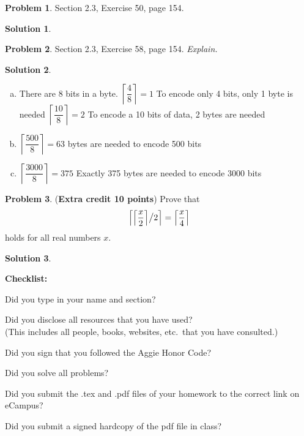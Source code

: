 \documentclass{article}
\theoremstyle{definition}
\newtheorem{problem}{Problem}
\newtheorem*{solution}{Solution}
\newcommand{\checklist}{\noindent\textbf{Checklist:}
\begin{compactitem}[$\Box$] 
\item Did you type in your name and section? 
\item Did you disclose all resources that you have used? \\
(This includes all people, books, websites, etc.\ that you have consulted.)
\item Did you sign that you followed the Aggie Honor Code? 
\item Did you solve all problems? 
\item Did you submit the .tex and .pdf files of your homework to the correct link on eCampus?
\item Did you submit a signed hardcopy of the pdf file in class? 
\end{compactitem}
}
\begin{document}
\begin{problem} Section 2.3, Exercise 50, page 154. 
\end{problem}
\begin{solution}
\end{solution}

\begin{problem} Section 2.3, Exercise 58, page 154. \textsl{Explain.}
\end{problem}
\begin{solution}
\begin{enumerate}[a)]
  \item There are 8 bits in a byte. $\left \lceil \dfrac{4}{8} \right \rceil = 1$ To encode only 4 bits, only 1 byte is needed
  $\left \lceil \dfrac{10}{8} \right \rceil = 2$ To encode a 10 bits of data, 2 bytes are needed
  \item $\left \lceil \dfrac{500}{8} \right \rceil =  63$ bytes are needed to encode 500 bits
  \item $\left \lceil \dfrac{3000}{8} \right \rceil = 375$ Exactly 375 bytes are needed to encode 3000 bits
\end{enumerate}
\end{solution}

\begin{problem} (\textbf{Extra credit 10 points}) Prove that 
$$ \left\lceil {\left\lceil \displaystyle\frac{x}{2} \right\rceil} \big{/} {2} \right\rceil = 
\left\lceil \displaystyle\frac{x}{4} \right\rceil$$ holds for all real numbers $x$.
\end{problem}
\begin{solution}
\end{solution}

\goodbreak
\checklist
\end{document}

